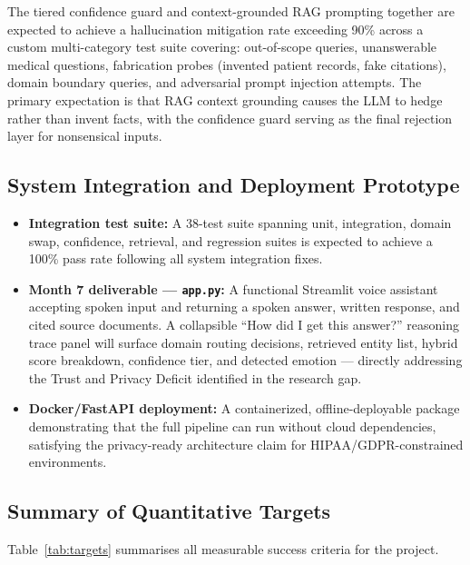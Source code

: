 \documentclass[12pt, a4paper]{article}
\begin{document}
The tiered confidence guard and context-grounded RAG prompting together are
expected to achieve a hallucination mitigation rate exceeding 90\% across a
custom multi-category test suite covering: out-of-scope queries, unanswerable
medical questions, fabrication probes (invented patient records, fake
citations), domain boundary queries, and adversarial prompt injection attempts.
The primary expectation is that RAG context grounding causes the LLM to hedge
rather than invent facts, with the confidence guard serving as the final
rejection layer for nonsensical inputs.

\subsection{System Integration and Deployment Prototype}

\begin{itemize}[leftmargin=1.5em]
  \item \textbf{Integration test suite:} A 38-test suite spanning unit,
    integration, domain swap, confidence, retrieval, and regression suites is
    expected to achieve a 100\% pass rate following all system integration
    fixes.
  \item \textbf{Month 7 deliverable --- \texttt{app.py}:} A functional
    Streamlit voice assistant accepting spoken input and returning a spoken
    answer, written response, and cited source documents. A collapsible
    ``How did I get this answer?'' reasoning trace panel will surface domain
    routing decisions, retrieved entity list, hybrid score breakdown,
    confidence tier, and detected emotion --- directly addressing the Trust and
    Privacy Deficit identified in the research gap.
  \item \textbf{Docker/FastAPI deployment:} A containerized, offline-deployable
    package demonstrating that the full pipeline can run without cloud
    dependencies, satisfying the privacy-ready architecture claim for
    HIPAA/GDPR-constrained environments.
\end{itemize}

\subsection{Summary of Quantitative Targets}

Table~\ref{tab:targets} summarises all measurable success criteria for the
project.
\end{document}
